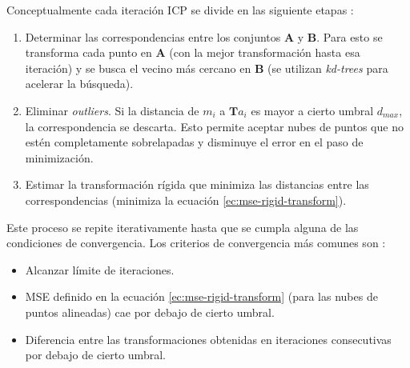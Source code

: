 Conceptualmente cada iteración ICP se divide en las siguiente etapas :
\begin{enumerate}

\item Determinar las correspondencias entre los conjuntos \textbf{A} y \textbf{B}. Para esto se transforma cada punto en \textbf{A} (con la mejor transformación hasta esa iteración) y se busca el vecino más cercano en \textbf{B} (se utilizan \textit{kd-trees}\cite{wiki-kdtree} para acelerar la búsqueda).

\item Eliminar \textit{outliers}. Si la distancia de $m_{i}$ a $\textbf{T}a_{i}$ es mayor a cierto umbral $d_{max}$, la correspondencia se descarta. Esto permite aceptar nubes de puntos que no estén completamente sobrelapadas y disminuye el error en el paso de minimización.

\item Estimar la transformación rígida que minimiza las distancias entre las correspondencias (minimiza la ecuación \ref{ec:mse-rigid-transform}).

\end{enumerate}

Este proceso se repite iterativamente hasta que se cumpla alguna de las condiciones de convergencia.
Los criterios de convergencia más comunes son :
\begin{itemize}
\item Alcanzar límite de iteraciones.

\item MSE definido en la ecuación \ref{ec:mse-rigid-transform} (para las nubes de puntos alineadas) cae por debajo de cierto umbral.

\item Diferencia entre las transformaciones obtenidas en iteraciones consecutivas por debajo de cierto umbral.
\end{itemize}

